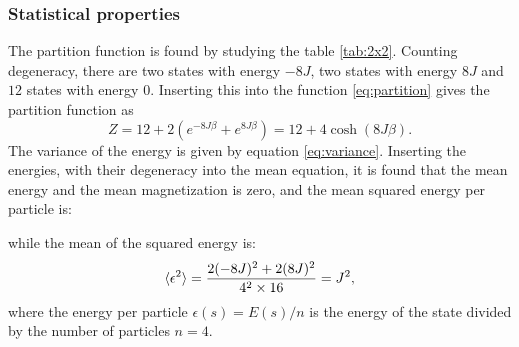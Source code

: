 \documentclass[english,notitlepage,reprint,nofootinbib]{revtex4-1}  %
\begin{document}
\subsubsection*{Statistical properties}
The partition function is found by studying the table \ref{tab:2x2}. Counting degeneracy, there are two states with energy $-8J$, two states with energy $8J$ and $12$ states with energy $0$. Inserting this into the function \ref{eq:partition} gives the partition function as
\begin{equation}\label{eq:partition_L2}
    Z = 12 + 2(e^{-8J\beta} + e^{8J\beta}) = 12 + 4\cosh(8J\beta).
\end{equation}
The variance of the energy is given by equation \ref{eq:variance}. Inserting the energies, with their degeneracy into the mean equation, it is found that the mean energy and the mean magnetization is zero, and the mean squared energy per particle is:

while the mean of the squared energy is:
\begin{equation}\label{eq:mean_square_energy}
    \braket{\epsilon^2} = \frac{2(-8J)^2 + 2(8J)^2}{4^2 \times 16} = J^2,
\end{equation}
where the energy per particle $\epsilon(s) = E(s)/n$ is the energy of the state divided by the number of particles $n=4$. 
\end{document}
